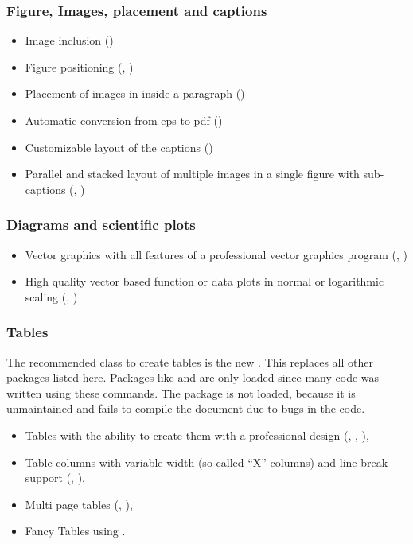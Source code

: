 \subsubsection*{Figure, Images, placement and captions}
\begin{itemize}
%
\item Image inclusion ()
\item Figure positioning (, )
\item Placement of images in inside a paragraph ()
\item Automatic conversion from eps to pdf ()
\item Customizable layout of the captions ()
\item Parallel and stacked layout of multiple images in a single figure with sub-captions (, )
%
\end{itemize}

\subsubsection*{Diagrams and scientific plots}
\begin{itemize}
\item Vector graphics with all features of a professional vector graphics program (, )
%
\item High quality vector based function or data plots in normal or logarithmic scaling (, )
\end{itemize}

\subsubsection*{Tables}
The recommended class to create tables is the new . This replaces all other packages listed here. Packages like  and  are only loaded since many code was written using these commands. The package  is not loaded, because it is unmaintained and fails to compile the document due to bugs in the code.
\begin{itemize}
\item Tables with the ability to create them with a professional design (, , ),
%
\item Table columns with variable width (so called \enquote{X} columns) and line break support (, ),
%
\item Multi page tables (, ),
%
\item Fancy Tables using .
\end{itemize}

